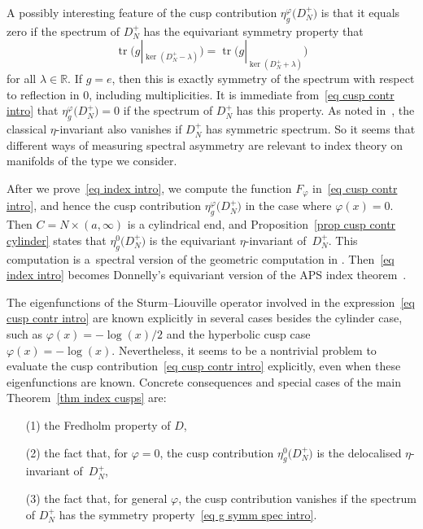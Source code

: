 \documentclass[pdftex]{sigma}%
\numberwithin{equation}{section}
\DeclareMathOperator{\tr}{tr}
\newcommand{\R}{\mathbb{R}}
\begin{document}
A possibly interesting feature of the cusp contribution $\eta_g^{\varphi}\big(D_N^+\big)$ is that it equals zero if the spectrum of $D_N^+$
has the equivariant symmetry property that
\begin{equation} \label{eq g symm spec intro}
\tr\big(g|_{\ker(D_N^+ - \lambda)}\big) = \tr\big(g|_{\ker(D_N^+ + \lambda)}\big)
\end{equation}
for all $\lambda \in \R$. If $g=e$, then this is exactly symmetry of the spectrum with respect to reflection in $0$, including multiplicities. It is immediate from~\eqref{eq cusp contr intro} that $\eta^{\varphi}_g\big(D_N^+\big)=0$ if the spectrum of $D_N^+$ has this property.
 As noted in~\cite{APS1}, the classical $\eta$-invariant also vanishes if $D_N^+$ has symmetric spectrum. So it seems that different ways of measuring spectral asymmetry are relevant to index theory on manifolds of the type we consider.

After we prove~\eqref{eq index intro}, we compute the function $F_{\varphi}$ in~\eqref{eq cusp contr intro}, and hence the cusp contribution $\eta_g^{\varphi}\big(D_N^+\big)$ in the case where $\varphi(x) = 0$. Then $C = N \times (a, \infty)$ is a cylindrical end, and Proposition~\ref{prop cusp contr cylinder} states that $\eta_g^{0}\big(D_N^+\big)$ is the equivariant $\eta$-invariant \cite{Donnelly} of~$D_N^+$. This computation is a~spectral version of the geometric computation in \cite[Section~5]{HW21a}. Then~\eqref{eq index intro} becomes Donnelly's equivariant version of the APS index theorem~\cite{Donnelly}.

The eigenfunctions of the Sturm--Liouville operator involved in the expression~\eqref{eq cusp contr intro} are known explicitly in several cases besides the cylinder case, such as $\varphi(x) = -\log(x)/2$ and the hyperbolic cusp case $\varphi(x) = -\log(x)$. Nevertheless,
 it seems to be a nontrivial problem to evaluate the cusp contribution~\eqref{eq cusp contr intro} explicitly, even when these eigenfunctions are known. Concrete consequences and special cases of the main Theorem~\ref{thm index cusps} are:
\begin{enumerate}\itemsep=0pt\samepage
\item[(1)] the Fredholm property of $D$,
\item[(2)] the fact that, for $\varphi = 0$, the cusp contribution $\eta_g^0\big(D_N^+\big)$ is the delocalised $\eta$-invariant of~$D_N^+$,
\item[(3)] the fact that, for general $\varphi$, the cusp contribution vanishes if the spectrum of $D_N^+$ has the symmetry property~\eqref{eq g symm spec intro}.
\end{enumerate}
\end{document}

